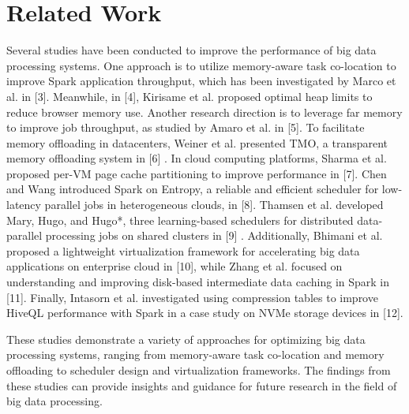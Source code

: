 \section{Related Work}


Several studies have been conducted to improve the performance of big
data processing systems. One approach is to utilize memory-aware task
co-location to improve Spark application throughput, which has been
investigated by Marco et al. in [3].  
Meanwhile, in [4], Kirisame et
al. proposed optimal heap limits to reduce browser memory use.
 Another
research direction is to leverage far memory to improve job
throughput, as studied by Amaro et al. in [5]. 
To facilitate memory
offloading in datacenters, Weiner et al. presented TMO, a transparent
memory offloading system in [6] . In cloud computing platforms, Sharma
et al. proposed per-VM page cache partitioning to improve performance
in [7]. Chen and Wang introduced Spark on Entropy, a reliable and
efficient scheduler for low-latency parallel jobs in heterogeneous
clouds, in [8]. Thamsen et al. developed Mary, Hugo, and Hugo*, three
learning-based schedulers for distributed data-parallel processing
jobs on shared clusters in [9] . Additionally, Bhimani et al. proposed
a lightweight virtualization framework for accelerating big data
applications on enterprise cloud in [10], while Zhang et al. focused
on understanding and improving disk-based intermediate data caching in
Spark in [11]. Finally, Intasorn et al. investigated using compression
tables to improve HiveQL performance with Spark in a case study on
NVMe storage devices in [12]. 
 
These studies demonstrate a variety of approaches for optimizing big
data processing systems, ranging from memory-aware task co-location
and memory offloading to scheduler design and virtualization
frameworks. The findings from these studies can provide insights and
guidance for future research in the field of big data processing.
